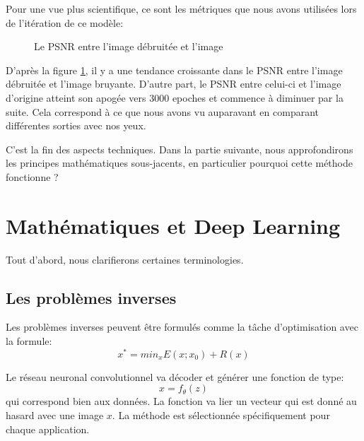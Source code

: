 \documentclass[
  12pt,
  dvipsnames]{article}
\begin{document}
Pour une vue plus scientifique, ce sont les métriques que nous avons utilisées lors de l'itération de ce modèle:

\begin{figure}

{\centering {}

}

\caption{Le PSNR entre l'image débruitée et l'image}\label{fig:model-psnr}
\end{figure}

D'après la figure \ref{fig:model-psnr}, il y a une tendance croissante dans le PSNR entre l'image débruitée et l'image bruyante. D'autre part, le PSNR entre celui-ci et l'image d'origine atteint son apogée vers 3000 epoches et commence à diminuer par la suite. Cela correspond à ce que nous avons vu auparavant en comparant différentes sorties avec nos yeux.

C'est la fin des aspects techniques. Dans la partie suivante, nous approfondirons les principes mathématiques sous-jacents, en particulier pourquoi cette méthode fonctionne ?

\newpage

\hypertarget{mathuxe9matiques-et-deep-learning}{%
\section{Mathématiques et Deep Learning}\label{mathuxe9matiques-et-deep-learning}}

Tout d'abord, nous clarifierons certaines terminologies.

\hypertarget{les-probluxe8mes-inverses}{%
\subsection{Les problèmes inverses}\label{les-probluxe8mes-inverses}}

Les problèmes inverses peuvent être formulés comme la tâche d'optimisation avec la formule:
\[x^* = min_{x}E(x;x_{0}) + R(x)\]

Le réseau neuronal convolutionnel va décoder et générer une fonction de type:
\[x = f_{\theta}(z)\]
qui correspond bien aux données. La fonction va lier un vecteur qui est donné au hasard avec une image \(x\).
La méthode est sélectionnée spécifiquement pour chaque application.
\end{document}
